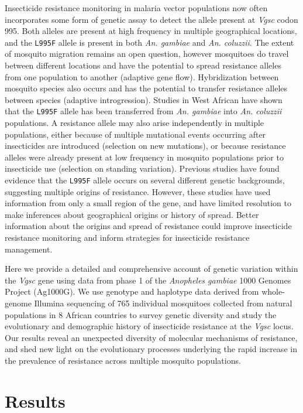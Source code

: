 \documentclass[a4paper,11pt,abstracton]{scrartcl}
\begin{document}
Insecticide resistance monitoring in malaria vector populations now often incorporates some form of genetic assay to detect the allele present at \emph{Vgsc} codon 995.
%
Both alleles are present at high frequency in multiple geographical locations, and the \texttt{L995F} allele is present in both \emph{An. gambiae} and \emph{An. coluzzii}.
%
The extent of mosquito migration remains an open question, however mosquitoes do travel between different locations and have the potential to spread resistance alleles from one population to another (adaptive gene flow).
%
Hybridization between mosquito species also occurs and has the potential to transfer resistance alleles between species (adaptive introgression).
%
Studies in West African have shown that the \texttt{L995F} allele has been transferred from \emph{An. gambiae} into \emph{An. coluzzii} populations.
%
A resistance allele may also arise independently in multiple populations, either because of multiple mutational events occurring after insecticides are introduced (selection on new mutations), or because resistance alleles were already present at low frequency in mosquito populations prior to insecticide use (selection on standing variation).
%
Previous studies have found evidence that the \texttt{L995F} allele occurs on several different genetic backgrounds, suggesting multiple origins of resistance.
%
However, these studies have used information from only a small region of the gene, and have limited resolution to make inferences about geographical origins or history of spread.
%
Better information about the origins and spread of resistance could improve insecticide resistance monitoring and inform strategies for insecticide resistance management.

Here we provide a detailed and comprehensive account of genetic variation within the \emph{Vgsc} gene using data from phase 1 of the \emph{Anopheles gambiae} 1000 Genomes Project (Ag1000G).
%
We use genotype and haplotype data derived from whole-genome Illumina sequencing of 765 individual mosquitoes collected from natural populations in 8 African countries to survey genetic diversity and study the evolutionary and demographic history of insecticide resistance at the \emph{Vgsc} locus.
%
Our results reveal an unexpected diversity of molecular mechanisms of resistance, and shed new light on the evolutionary processes underlying the rapid increase in the prevalence of resistance across multiple mosquito populations.


\section*{Results}
\end{document}
